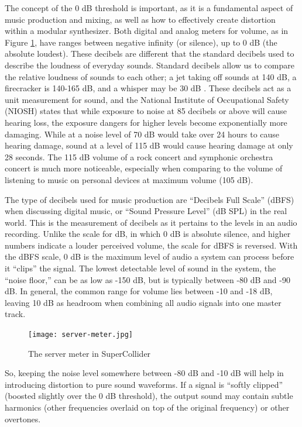 The concept of the 0 dB threshold is important, as it is a fundamental aspect of music production and mixing, as well as how to effectively create distortion within a modular synthesizer. Both digital and analog meters for volume, as in Figure \ref{fig:server-meter}, have ranges between negative infinity (or silence), up to 0 dB (the absolute loudest). These decibels are different that the standard decibels used to describe the loudness of everyday sounds. Standard decibels allow us to compare the relative loudness of sounds to each other; a jet taking off sounds at 140 dB, a firecracker is 140-165 dB, and a whisper may be 30 dB \cite{Hearing_Health_Foundation}. These decibels act as a unit measurement for sound, and the National Institute of Occupational Safety (NIOSH) states that while exposure to noise at 85 decibels or above  will cause hearing loss, the exposure dangers for higher levels become exponentially more damaging. While at a noise level of 70 dB would take over 24 hours to cause hearing damage, sound at a level of 115 dB would cause hearing damage at only 28 seconds. The 115 dB volume of a rock concert and symphonic orchestra concert is much more noticeable, especially when comparing to the volume of listening to music on personal devices at maximum volume (105 dB).

The type of decibels used for music production are ``Decibels Full Scale'' (dBFS) when discussing digital music, or ``Sound Pressure Level'' (dB SPL) in the real world. This is the measurement of decibels as it pertains to the levels in an audio recording. Unlike the scale for dB, in which 0 dB is absolute silence, and higher numbers indicate a louder perceived volume, the scale for dBFS is reversed. With the dBFS scale, 0 dB is the maximum level of audio a system can process before it ``clips'' the signal. The lowest detectable level of sound in the system, the ``noise floor,''  can be as low as -150 dB, but is typically between -80 dB and -90 dB. In general, the common range for volume lies between -10 and -18 dB, leaving 10 dB as headroom when combining all audio signals into one master track.

\begin{figure}[ht]
  \centering
  \texttt{[image: server-meter.jpg]}
  \caption{The server meter in SuperCollider}
  \label{fig:server-meter}
\end{figure}

So, keeping the noise level somewhere between -80 dB and -10 dB will help in introducing distortion to pure sound waveforms. If a signal is ``softly clipped'' (boosted slightly over the 0 dB threshold), the output sound may contain subtle harmonics (other frequencies overlaid on top of the original frequency) or other overtones. 

